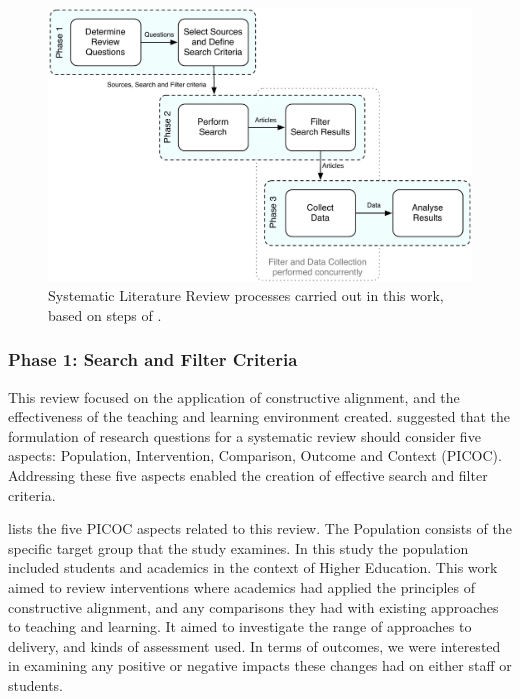 \begin{figure}[tbph]
	\centering
	\includegraphics[width=\textwidth]{SystematicReview}
	\caption{Systematic Literature Review processes carried out in this work, based on steps of \citet{Kitchenham:2004}.}
	\label{fig:struct_review_proc}
\end{figure}



\subsubsection{Phase 1: Search and Filter Criteria} %
\label{sub:review_questions}

This review focused on the application of constructive alignment, and the effectiveness of the teaching and learning environment created. \citet{Petticrew:2008} suggested that the formulation of research questions for a systematic review should consider five aspects: Population, Intervention, Comparison, Outcome and Context (PICOC). Addressing these five aspects enabled the creation of effective search and filter criteria.

 lists the five PICOC aspects related to this review. The Population consists of the specific target group that the study examines. In this study the population included students and academics in the context of Higher Education. This work aimed to review interventions where academics had applied the principles of constructive alignment, and any comparisons they had with existing approaches to teaching and learning. It aimed to investigate the range of approaches to delivery, and kinds of assessment used. In terms of outcomes, we were interested in examining any positive or negative impacts these changes had on either staff or students.

